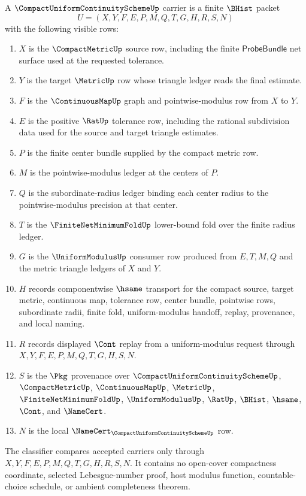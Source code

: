 \begin{definition}
\label{def:compact-uniform-continuity-scheme-carrier}
A $\CompactUniformContinuitySchemeUp$ carrier is a finite $\BHist$ packet
$$
U=(X,Y,F,E,P,M,Q,T,G,H,R,S,N)
$$
with the following visible rows:
\begin{enumerate}
\item $X$ is the $\CompactMetricUp$ source row, including the finite $\mathsf{ProbeBundle}$ net surface used at the requested tolerance.
\item $Y$ is the target $\MetricUp$ row whose triangle ledger reads the final estimate.
\item $F$ is the $\ContinuousMapUp$ graph and pointwise-modulus row from $X$ to $Y$.
\item $E$ is the positive $\RatUp$ tolerance row, including the rational subdivision data used for the source and target triangle estimates.
\item $P$ is the finite center bundle supplied by the compact metric row.
\item $M$ is the pointwise-modulus ledger at the centers of $P$.
\item $Q$ is the subordinate-radius ledger binding each center radius to the pointwise-modulus precision at that center.
\item $T$ is the $\FiniteNetMinimumFoldUp$ lower-bound fold over the finite radius ledger.
\item $G$ is the $\UniformModulusUp$ consumer row produced from $E,T,M,Q$ and the metric triangle ledgers of $X$ and $Y$.
\item $H$ records componentwise $\hsame$ transport for the compact source, target metric, continuous map, tolerance row, center bundle, pointwise rows, subordinate radii, finite fold, uniform-modulus handoff, replay, provenance, and local naming.
\item $R$ records displayed $\Cont$ replay from a uniform-modulus request through $X,Y,F,E,P,M,Q,T,G,H,S,N$.
\item $S$ is the $\Pkg$ provenance over $\CompactUniformContinuitySchemeUp$, $\CompactMetricUp$, $\ContinuousMapUp$, $\MetricUp$, $\FiniteNetMinimumFoldUp$, $\UniformModulusUp$, $\RatUp$, $\BHist$, $\hsame$, $\Cont$, and $\NameCert$.
\item $N$ is the local $\NameCert_{\CompactUniformContinuitySchemeUp}$ row.
\end{enumerate}
The classifier compares accepted carriers only through $X,Y,F,E,P,M,Q,T,G,H,R,S,N$. It contains no open-cover compactness coordinate, selected Lebesgue-number proof, host modulus function, countable-choice schedule, or ambient completeness theorem.
\end{definition}

